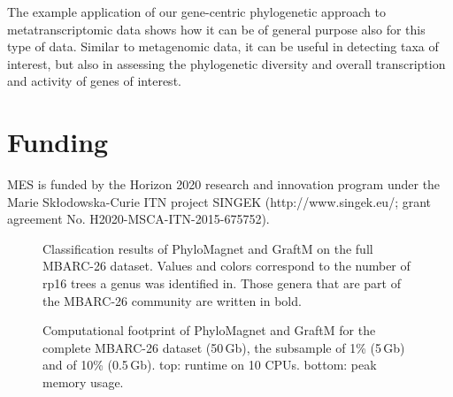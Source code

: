 \documentclass{bioinfo}
\begin{document}
The example application of our gene-centric phylogenetic approach to metatranscriptomic data shows how it can be of general purpose also for this type of data. Similar to metagenomic data, it can be useful in detecting taxa of interest, but also in assessing the phylogenetic diversity and overall transcription and activity of genes of interest.




\section*{Funding}
MES is funded by the Horizon 2020 research and innovation program under the Marie Sk\l{}odowska-Curie ITN project SINGEK (http://www.singek.eu/; grant agreement No. H2020-MSCA-ITN-2015-675752).

%



\renewcommand\thefigure{S\arabic{figure}}
\setcounter{figure}{0}    
\begin{figure}[!h]%
\centerline{}
\caption{Classification results of PhyloMagnet and GraftM on the full MBARC-26 dataset. Values and colors correspond to the number of rp16 trees a genus was identified in. Those genera that are part of the MBARC-26 community are written in bold.}\label{fig:S1}
\end{figure}

\begin{figure}[!h]%
\centerline{}
\caption{Computational footprint of PhyloMagnet and GraftM for the complete MBARC-26 dataset (50\,Gb), the subsample of 1\% (5\,Gb) and of 10\% (0.5\,Gb). top: runtime on 10 CPUs. bottom: peak memory usage.}\label{fig:S2}
\end{figure}
\end{document}
